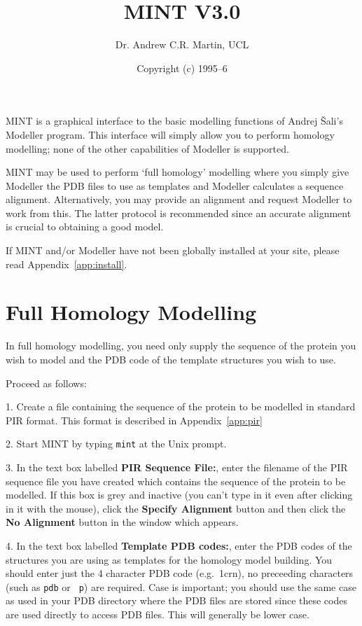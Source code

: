 \documentclass[12pt]{article}
\title{MINT V3.0}
\author{Dr. Andrew C.R. Martin, UCL}
\date{Copyright (c) 1995--6}
\begin{document}
\maketitle

MINT is a graphical interface to the basic modelling functions of
Andrej \v{S}ali's Modeller program. This interface will simply allow you
to perform homology modelling; none of the other capabilities of
Modeller is supported. 

MINT may be used to perform `full homology' modelling where you simply
give Modeller the PDB files to use as templates and Modeller
calculates a sequence alignment. Alternatively, you may provide an
alignment and request Modeller to work from this. The latter protocol
is recommended since an accurate alignment is crucial to obtaining a
good model.

If MINT and/or Modeller have not been globally installed at your
site, please read Appendix~\ref{app:install}.


\section{Full Homology Modelling}
In full homology modelling, you need only supply the sequence of the
protein you wish to model and the PDB code of the template structures
you wish to use.
\vspace{1em}

\noindent Proceed as follows:

1. Create a file containing the sequence of the protein to be modelled
in standard PIR format. This format is described in
Appendix~\ref{app:pir}

2. Start MINT by typing {\tt mint} at the Unix prompt.

3. In the text box labelled {\bfseries PIR Sequence File:}, enter the
filename of the PIR sequence file you have created which contains the
sequence of the protein to be modelled. If this box is grey and
inactive (you can't type in it even after clicking in it with the
mouse), click the {\bfseries Specify Alignment} button and then click
the {\bfseries No Alignment} button in the window which appears.

4. In the text box labelled {\bfseries Template PDB codes:}, enter the
PDB codes of the structures you are using as templates for the
homology model building. You should enter just the 4 character PDB
code (e.g.\ 1crn), no preceeding characters (such as {\tt pdb} or {\tt
p}) are required. Case is important; you should use the same case as
used in your PDB directory where the PDB files are stored since these
codes are used directly to access PDB files. This will generally be
lower case.
\end{document}
